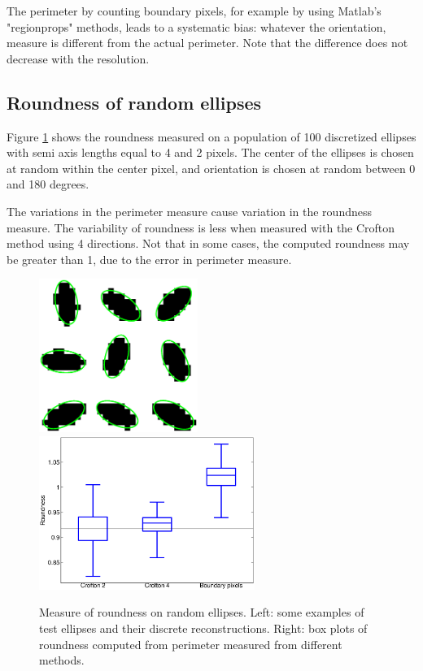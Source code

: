 \documentclass{InsightArticle}
\begin{document}
The perimeter by counting boundary pixels, for example by using Matlab's "regionprops" methods, 
leads to a systematic bias: whatever the orientation, measure is different from the actual perimeter.
Note that the difference does not decrease with the resolution.

\subsection{Roundness of random ellipses}

Figure \ref{fig:RoundnessRandomEllipses} shows the roundness measured on a population of 100 discretized ellipses with 
semi axis lengths equal to 4 and 2 pixels. The center of the ellipses is chosen at random within the center pixel, and orientation
is chosen at random between 0 and 180 degrees. 

The variations in the perimeter measure cause variation in the roundness measure. The variability of roundness is less when measured
with the Crofton method using 4 directions. Not that in some cases, the computed roundness may be greater than 1, due to the error in perimeter measure.

\begin{figure}[!htb]
\begin{center}
\includegraphics[height=5cm]{images/demoEllipses42}
\includegraphics[height=5cm]{images/roundnessEllipses42Boxplot}
\end{center}
\caption{Measure of roundness on random ellipses. Left: some examples of test ellipses and their discrete reconstructions. 
Right: box plots of roundness computed from perimeter measured from different methods.}
\label{fig:RoundnessRandomEllipses}
\end{figure}
\end{document}
